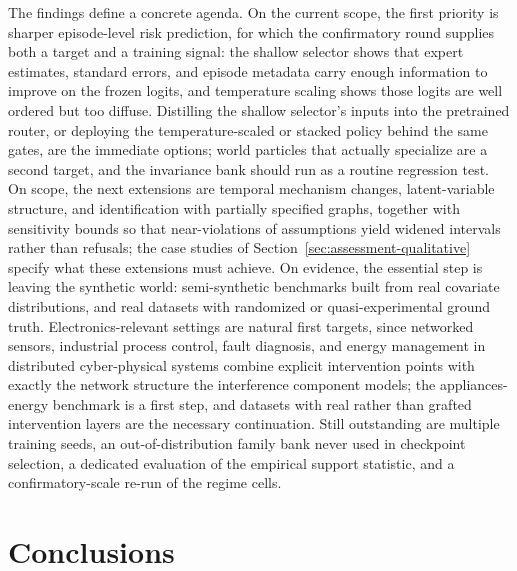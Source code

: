 \documentclass[electronics,article,submit,oneauthor]{Definitions/mdpi}
\begin{document}
The findings define a concrete agenda. On the current scope, the first priority is sharper episode-level risk prediction, for which the confirmatory round supplies both a target and a training signal: the shallow selector shows that expert estimates, standard errors, and episode metadata carry enough information to improve on the frozen logits, and temperature scaling shows those logits are well ordered but too diffuse. Distilling the shallow selector's inputs into the pretrained router, or deploying the temperature-scaled or stacked policy behind the same gates, are the immediate options; world particles that actually specialize are a second target, and the invariance bank should run as a routine regression test. On scope, the next extensions are temporal mechanism changes, latent-variable structure, and identification with partially specified graphs, together with sensitivity bounds so that near-violations of assumptions yield widened intervals rather than refusals; the case studies of Section~\ref{sec:assessment-qualitative} specify what these extensions must achieve. On evidence, the essential step is leaving the synthetic world: semi-synthetic benchmarks built from real covariate distributions, and real datasets with randomized or quasi-experimental ground truth. Electronics-relevant settings are natural first targets, since networked sensors, industrial process control, fault diagnosis, and energy management in distributed cyber-physical systems combine explicit intervention points with exactly the network structure the interference component models; the appliances-energy benchmark is a first step, and datasets with real rather than grafted intervention layers are the necessary continuation. Still outstanding are multiple training seeds, an out-of-distribution family bank never used in checkpoint selection, a dedicated evaluation of the empirical support statistic, and a confirmatory-scale re-run of the regime cells.

\section{Conclusions}\label{sec:conclusion}
\end{document}
